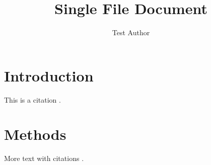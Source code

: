 \documentclass{article}
\begin{document}
\title{Single File Document}
\author{Test Author}
\maketitle

\section{Introduction}

This is a citation \cite{kitchin-2015-examp}.

\section{Methods}

More text with citations \cite{smith2020,jones2019}.



\end{document}
